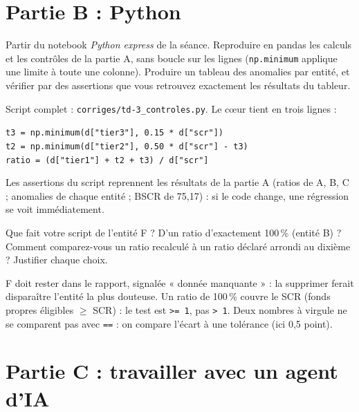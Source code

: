 \documentclass[11pt,a4paper]{article}
\newcommand{\fx}[1]{\texttt{\small #1}}
\begin{document}
\section{Partie B : Python}

\begin{exercice}[Automatiser]
Partir du notebook \emph{Python express} de la séance. Reproduire en pandas les calculs et les
contrôles de la partie A, sans boucle sur les lignes (\fx{np.minimum} applique une limite à toute
une colonne). Produire un tableau des anomalies par entité, et vérifier par des assertions que vous
retrouvez exactement les résultats du tableur.
\end{exercice}
\begin{corrige}
Script complet : \texttt{corriges/td-3\_controles.py}. Le cœur tient en trois lignes :

\smallskip
\fx{t3 = np.minimum(d["tier3"], 0.15 * d["scr"])}\\
\fx{t2 = np.minimum(d["tier2"], 0.50 * d["scr"] - t3)}\\
\fx{ratio = (d["tier1"] + t2 + t3) / d["scr"]}

\smallskip
Les assertions du script reprennent les résultats de la partie A (ratios de A, B, C ; anomalies
de chaque entité ; BSCR de 75,17) : si le code change, une régression se voit immédiatement.
\end{corrige}

\begin{exercice}
Que fait votre script de l'entité F ? D'un ratio d'exactement 100\,\% (entité B) ? Comment
comparez-vous un ratio recalculé à un ratio déclaré arrondi au dixième ? Justifier chaque choix.
\end{exercice}
\begin{corrige}
F doit rester dans le rapport, signalée « donnée manquante » : la supprimer ferait disparaître
l'entité la plus douteuse. Un ratio de 100\,\% couvre le SCR (fonds propres éligibles $\geq$ SCR) :
le test est \fx{>= 1}, pas \fx{> 1}. Deux nombres à virgule ne se comparent pas avec \fx{==} :
on compare l'écart à une tolérance (ici 0,5 point).
\end{corrige}

\section{Partie C : travailler avec un agent d'IA}
\end{document}
